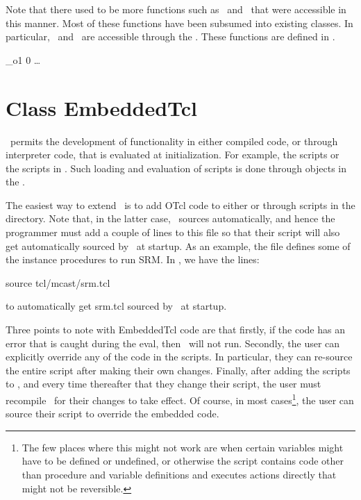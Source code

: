 Note that there used to be more functions such as \ and
\ that were accessible in this manner.
Most of these functions have been subsumed into existing classes.
In particular, \ and \ are accessible
through the
.
These functions are defined in .
\begin{program}
            _o1
            0
            \ldots
\end{program}
          

\section{Class EmbeddedTcl}
\label{sec:EmbeddedTcl}

\ns\ permits the development of functionality in either compiled code,
or through interpreter code, that is evaluated at initialization.
For example, the scripts  or the scripts in
.
Such loading and evaluation of scripts is done through objects in the
.

The easiest way to extend \ns\ is to add OTcl code
to either  or through scripts
in the  directory.
Note that, in the latter case, \ns\ sources
 automatically, and hence
the programmer must add a couple of lines to this file
so that their script will also get automatically sourced by \ns\
at startup.
As an example,
the file  defines some of the instance procedures
to run SRM.
In , we have the lines:
\begin{program}
	source tcl/mcast/srm.tcl
\end{program}
to automatically get srm.tcl sourced by \ns\ at startup.

Three points to note with EmbeddedTcl code are that
firstly, if the code has an error that is caught during the eval,
then \ns\ will not run.
Secondly, the user can explicitly override any of the code in the scripts.
In particular, they can re-source the entire script after making their own
changes. 
Finally, after adding the scripts to , and
every time thereafter that they change their script, the user
must recompile \ns\ for their changes to take effect.
Of course, in most cases\footnote{%
The few places where this might not work
are when certain variables might have to be defined or undefined,
or otherwise the script contains code
other than procedure and variable definitions and 
executes actions directly that might not be reversible.},
the user can source their script
to override the embedded code.


